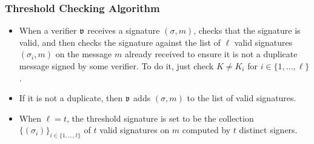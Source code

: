 
\subsubsection*{Threshold Checking Algorithm}
\begin{itemize}[align = left, leftmargin=*, label={--}]
\item When a verifier ${\mathfrak v}$ receives a signature $(\sigma, m)$, checks that the signature is valid, and then checks the signature against the list of $\ell$ valid signatures $(\sigma_i,m)$ on the message $m$ already received to ensure it is not a duplicate message signed by some verifier. To do it, just check $K \neq K_i$ for $i \in \{1, ..., \ell \}$.

\item If it is not a duplicate, then ${\mathfrak v}$ adds $(\sigma, m)$ to the list of valid signatures.

\item When $\ell = t$, the threshold signature is set to be the collection $\{(\sigma_i)\}_{i\in \{1,...,t\}}$ of $t$ valid signatures on $m$ computed by $t$ distinct signers.


\end{itemize}

